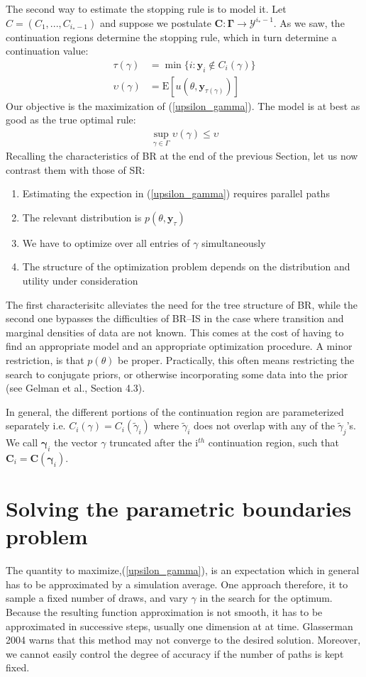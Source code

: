 \documentclass[11pt]{article}
\begin{document}
The second way to estimate the stopping rule is to model it. Let $C=(C_1,...,C_{i_*-1})$ and suppose we postulate $\mathbf{C}:\mathbf{\Gamma}\rightarrow \mathcal{Y}^{i_*-1}$. As we saw, the continuation regions determine the stopping rule, which in turn determine a continuation value:
\begin{align}\label{tau_gamma}
\tau(\gamma)&=\min\{i:\mathbf{y}_i\notin C_i(\gamma)\}\\
\label{upsilon_gamma}
\upsilon(\gamma)&=\mathrm{E}[u(\theta,\mathbf{y}_{\tau(\gamma)})]
\end{align}Our objective is the maximization of (\ref{upsilon_gamma}). The model is at best as good as the true optimal rule:
\begin{align}
\sup_{\gamma\in\Gamma}\upsilon(\gamma)\leq \upsilon
\end{align}Recalling the characteristics of BR at the end of the previous Section, let us now contrast them with those of SR:
\begin{enumerate}
\item Estimating the expection in (\ref{upsilon_gamma}) requires parallel paths
\item The relevant distribution is $p(\theta,\mathbf{y}_\tau)$
\item We have to optimize over all entries of $\gamma$ simultaneously
\item The structure of the optimization problem depends on the distribution and utility under consideration
\end{enumerate}The first characterisitc alleviates the need for the tree structure of BR, while the second one bypasses the difficulties of BR--IS in the case where transition and marginal densities of data are not known. 
This comes at the cost of having to find an appropriate model and an appropriate optimization procedure. A minor restriction, is that $p(\theta)$ be proper. Practically, this often means restricting the search to conjugate priors, or otherwise incorporating some data into the prior (see Gelman et al., Section 4.3).

In general, the different portions of the continuation region are parameterized separately i.e. $C_i(\gamma)=C_i(\tilde \gamma_i)$ where $\tilde \gamma_i$ does not overlap with any of the $\tilde \gamma_j$'s. We call $\boldsymbol{\gamma}_i$ the vector $\gamma$ truncated after the i$^{th}$ continuation region, such that $\mathbf{C}_i=\mathbf{C}(\boldsymbol\gamma_i)$.

\section{Solving the parametric boundaries problem}\label{sec:param}
The quantity to maximize,(\ref{upsilon_gamma}), is an expectation which in general has to be approximated by a simulation average. One approach therefore, it to sample a fixed number of draws, and vary $\gamma$ in the search for the optimum. Because the resulting function approximation is not smooth, it has to be approximated in successive steps, usually one dimension at at time. Glasserman 2004 warns that this method may not converge to the desired solution. Moreover, we cannot easily control the degree of accuracy if the number of paths is kept fixed.
\end{document}
